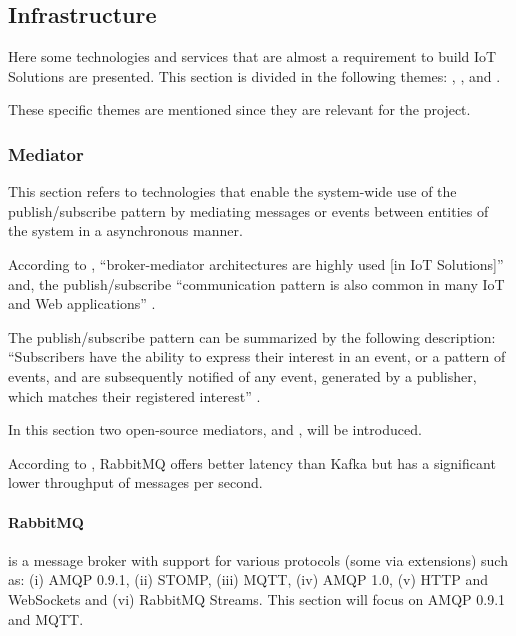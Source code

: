 \subsection{Infrastructure} %
\label{subsec:stateofart:arch:infra}

Here some technologies and services that are almost a requirement to build \gls{IoT} Solutions are presented. This section is divided in the following themes: , ,  and .

These specific themes are mentioned since they are relevant for the project.

\subsubsection{Mediator}
\label{subsubsec:stateofart:arch:infra:mediator}

This section refers to technologies that enable the system-wide use of the publish/subscribe pattern by mediating messages or events between entities of the system in a asynchronous manner.

According to \cite{DIAS2022100529}, ``broker-mediator architectures are highly used [in \gls{IoT} Solutions]'' and, the publish/subscribe ``communication pattern is also common in many IoT and Web applications'' \parencite{LAZIDIS2022100538}. 

The publish/subscribe pattern can be summarized by the following description: ``Subscribers have the ability to express their interest in an event, or a pattern of events, and are subsequently notified of any event, generated by a publisher, which matches their registered interest'' \parencite{10.1145857076.857078}.

In this section two open-source mediators,  and , will be introduced.

According to \cite{LAZIDIS2022100538}, RabbitMQ offers better latency than Kafka but has a significant lower throughput of messages per second.

\paragraph{RabbitMQ}
\label{par:stateofart:arch:infra:mediator:rabbitmq}

 is a message broker with support for various protocols (some via extensions) such as: (i) \gls{AMQP} 0.9.1, (ii) STOMP, (iii) \gls{MQTT}, (iv) \gls{AMQP} 1.0, (v) HTTP and WebSockets and (vi) RabbitMQ Streams. This section will focus on \gls{AMQP} 0.9.1 and \gls{MQTT}.

